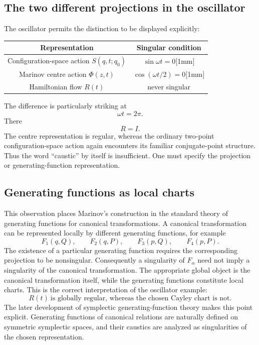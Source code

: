 \subsection{The two different projections in the oscillator}
The oscillator permits the distinction to be displayed explicitly:
\begin{center}
\begin{tabular}{c|c}
\hline
Representation & Singular condition\\
\hline
Configuration-space action \(S(q,t;q_0)\)&\(\sin\omega t=0\)[1mm]\\
Marinov centre action \(\Phi(z,t)\)&\(\cos(\omega t/2)=0\)[1mm]\\
Hamiltonian flow \(R(t)\)& never singular\\
\hline
\end{tabular}
\end{center}
The difference is particularly striking at
\begin{equation}
 \omega t=2\pi.
\end{equation}
There
\begin{equation}
 R=I.
\end{equation}
The centre representation is regular, whereas the ordinary two-point
configuration-space action again encounters its familiar conjugate-point
structure.
Thus the word ``caustic'' by itself is insufficient.  One must specify the
projection or generating-function representation.
\subsection{Generating functions as local charts}
This observation places Marinov's construction in the standard theory of
generating functions for canonical transformations.
A canonical transformation can be represented locally by different
generating functions, for example
\begin{equation}
 F_1(q,Q),\qquad
 F_2(q,P),\qquad
 F_3(p,Q),\qquad
 F_4(p,P).
\end{equation}
The existence of a particular generating function requires the corresponding
projection to be nonsingular.
Consequently a singularity of \(F_\alpha\) need not imply a singularity of
the canonical transformation.
The appropriate global object is the canonical transformation itself,
while the generating functions constitute local charts.
This is the correct interpretation of the oscillator example:
\begin{equation}
 \boxed{
 R(t)\ \text{is globally regular, whereas the chosen Cayley chart is not.}
 }
\end{equation}
The later development of symplectic generating-function theory makes this
point explicit.  Generating functions of canonical relations are naturally
defined on symmetric symplectic spaces, and their caustics are analyzed as
singularities of the chosen representation. \cite{RiosOzorio2002,RiosOzorio2004}
